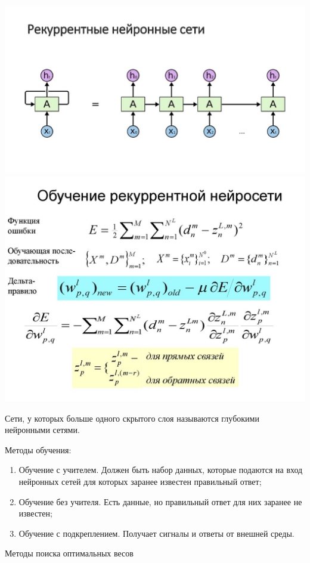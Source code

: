 \documentclass[12pt,a4paper]{report}
\begin{document}
\begin{enumerate}
\includegraphics{rek}
\includegraphics{rek2}

\end{enumerate}

Сети, у которых больше одного скрытого слоя называются глубокими нейронными сетями. 

Методы обучения:
\begin{enumerate}
	\item Обучение с учителем. Должен быть набор данных, которые подаются на вход нейронных сетей для которых заранее известен правильный ответ;
	\item Обучение без учителя. Есть данные, но правильный ответ для них заранее не известен;
	\item Обучение с подкреплением. Получает сигналы и ответы от внешней среды.
\end{enumerate}


 Методы поиска оптимальных весов 
\end{document}
